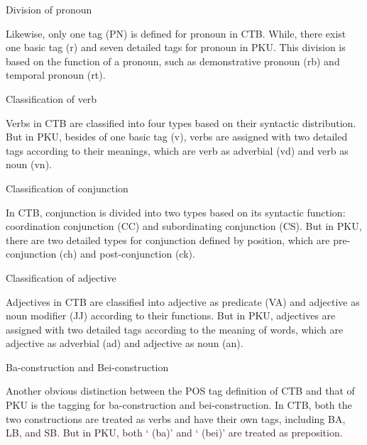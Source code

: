 \documentclass[english]{jnlp_1.4}
\renewcommand{\subsubsection}{}
\begin{document}
\subsubsection{Division of pronoun}

Likewise, only one tag (PN) is defined for pronoun in CTB. While, there 
exist one basic tag (r) and seven detailed tags for pronoun in PKU. This 
division is based on the function of a pronoun, such as demonstrative 
pronoun (rb) and temporal pronoun (rt).

\subsubsection{Classification of verb}

Verbs in CTB are classified into four types based on their syntactic 
distribution. But in PKU, besides of one basic tag (v), verbs are assigned 
with two detailed tags according to their meanings, which are verb as 
adverbial (vd) and verb as noun (vn).

\subsubsection{Classification of conjunction}

In CTB, conjunction is divided into two types based on its syntactic 
function: coordination conjunction (CC) and subordinating conjunction (CS). 
But in PKU, there are two detailed types for conjunction defined by 
position, which are pre-conjunction (ch) and post-conjunction (ck).

\subsubsection{Classification of adjective}

Adjectives in CTB are classified into adjective as predicate (VA) and 
adjective as noun modifier (JJ) according to their functions. But in PKU, 
adjectives are assigned with two detailed tags according to the meaning of 
words, which are adjective as adverbial (ad) and adjective as noun (an).

\subsubsection{Ba-construction and Bei-construction}

Another obvious distinction between the POS tag definition of CTB and that 
of PKU is the tagging for ba-construction and bei-construction. In CTB, both 
the two constructions are treated as verbs and have their own tags, 
including BA, LB, and SB. But in PKU, both ` (ba)' and 
` (bei)' are treated as preposition.
\end{document}
